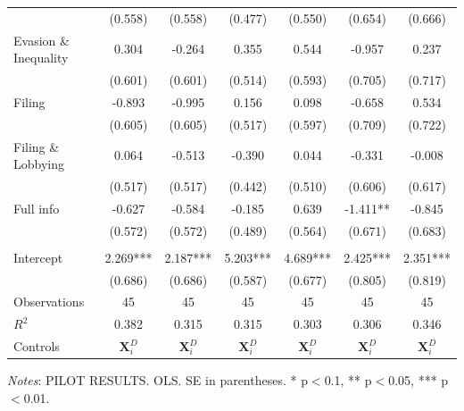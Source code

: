\documentclass[11pt]{article}
\begin{document}
\begin{landscape}
\begin{table}[!htbp]
\begin{threeparttable}
\begin{tabular}{l|cccccc}
 & (0.558) & (0.558) & (0.477) & (0.550) & (0.654) & (0.666) \\
Evasion \& Inequality & 0.304 & -0.264 & 0.355 & 0.544 & -0.957 & 0.237 \\
 & (0.601) & (0.601) & (0.514) & (0.593) & (0.705) & (0.717) \\
Filing & -0.893 & -0.995 & 0.156 & 0.098 & -0.658 & 0.534 \\
 & (0.605) & (0.605) & (0.517) & (0.597) & (0.709) & (0.722) \\
Filing \& Lobbying & 0.064 & -0.513 & -0.390 & 0.044 & -0.331 & -0.008 \\
 & (0.517) & (0.517) & (0.442) & (0.510) & (0.606) & (0.617) \\
Full info & -0.627 & -0.584 & -0.185 & 0.639 & -1.411** & -0.845 \\
 & (0.572) & (0.572) & (0.489) & (0.564) & (0.671) & (0.683) \\
\\[0.5em]
Intercept & 2.269*** & 2.187*** & 5.203*** & 4.689*** & 2.425*** & 2.351*** \\
 & (0.686) & (0.686) & (0.587) & (0.677) & (0.805) & (0.819) \\
\midrule
Observations & 45 & 45 & 45 & 45 & 45 & 45 \\
$R^2$ & 0.382 & 0.315 & 0.315 & 0.303 & 0.306 & 0.346 \\
Controls & $\mathbf{X}_{i}^{D}$ & $\mathbf{X}_{i}^{D}$ & $\mathbf{X}_{i}^{D}$ & $\mathbf{X}_{i}^{D}$ & $\mathbf{X}_{i}^{D}$ & $\mathbf{X}_{i}^{D}$ \\
\bottomrule
\end{tabular}
\begin{tablenotes}[flushleft]
\footnotesize
\item \textit{Notes}: PILOT RESULTS. OLS. SE in parentheses. * p$<$0.1, ** p$<$0.05, *** p$<$0.01.
\end{tablenotes}
\end{threeparttable}
\end{table}
\end{landscape}
\FloatBarrier
\end{document}
